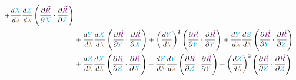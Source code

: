 \begin{align*}
    + \frac{d \begingroup\color{cyan}X\endgroup}{d \begingroup\color{brown}\lambda\endgroup} \frac{d \begingroup\color{cyan}Z\endgroup}{d \begingroup\color{brown}\lambda\endgroup}\left(\frac{\partial \begingroup\color{violet}\vec{R}\endgroup}{\partial \begingroup\color{cyan}X\endgroup} \cdot \frac{\partial \begingroup\color{violet}\vec{R}\endgroup}{\partial \begingroup\color{cyan}Z\endgroup}\right)\\
    &+ \frac{d \begingroup\color{cyan}Y\endgroup}{d \begingroup\color{brown}\lambda\endgroup} \frac{d \begingroup\color{cyan}X\endgroup}{d \begingroup\color{brown}\lambda\endgroup}\left(\frac{\partial \begingroup\color{violet}\vec{R}\endgroup}{\partial \begingroup\color{cyan}Y\endgroup} \cdot \frac{\partial \begingroup\color{violet}\vec{R}\endgroup}{\partial \begingroup\color{cyan}X\endgroup}\right)
    + \left(\frac{d \begingroup\color{cyan}Y\endgroup}{d \begingroup\color{brown}\lambda\endgroup}\right)^2 \left(\frac{\partial \begingroup\color{violet}\vec{R}\endgroup}{\partial \begingroup\color{cyan}Y\endgroup} \cdot \frac{\partial \begingroup\color{violet}\vec{R}\endgroup}{\partial \begingroup\color{cyan}Y\endgroup}\right)
    + \frac{d \begingroup\color{cyan}Y\endgroup}{d \begingroup\color{brown}\lambda\endgroup} \frac{d \begingroup\color{cyan}Z\endgroup}{d \begingroup\color{brown}\lambda\endgroup}\left(\frac{\partial \begingroup\color{violet}\vec{R}\endgroup}{\partial \begingroup\color{cyan}Y\endgroup} \cdot \frac{\partial \begingroup\color{violet}\vec{R}\endgroup}{\partial \begingroup\color{cyan}Z\endgroup}\right)\\
    &+ \frac{d \begingroup\color{cyan}Z\endgroup}{d \begingroup\color{brown}\lambda\endgroup} \frac{d \begingroup\color{cyan}X\endgroup}{d \begingroup\color{brown}\lambda\endgroup}\left(\frac{\partial \begingroup\color{violet}\vec{R}\endgroup}{\partial \begingroup\color{cyan}Z\endgroup} \cdot \frac{\partial \begingroup\color{violet}\vec{R}\endgroup}{\partial \begingroup\color{cyan}X\endgroup}\right)
    + \frac{d \begingroup\color{cyan}Z\endgroup}{d \begingroup\color{brown}\lambda\endgroup} \frac{d \begingroup\color{cyan}Y\endgroup}{d \begingroup\color{brown}\lambda\endgroup}\left(\frac{\partial \begingroup\color{violet}\vec{R}\endgroup}{\partial \begingroup\color{cyan}Z\endgroup} \cdot \frac{\partial \begingroup\color{violet}\vec{R}\endgroup}{\partial \begingroup\color{cyan}Y\endgroup}\right)
    + \left(\frac{d \begingroup\color{cyan}Z\endgroup}{d \begingroup\color{brown}\lambda\endgroup}\right)^2 \left(\frac{\partial \begingroup\color{violet}\vec{R}\endgroup}{\partial \begingroup\color{cyan}Z\endgroup} \cdot \frac{\partial \begingroup\color{violet}\vec{R}\endgroup}{\partial \begingroup\color{cyan}Z\endgroup}\right)
\end{align*}

